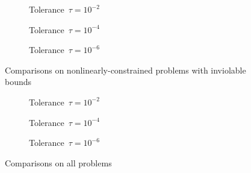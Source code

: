 \begin{figure}[ht]
    \centering
    \begin{subfigure}[b]{0.49\textwidth}
        \centering
        \caption{Tolerance~$\tau = 10^{-2}$}
    \end{subfigure}
    \hfill
    \begin{subfigure}[b]{0.49\textwidth}
        \centering
        \caption{Tolerance~$\tau = 10^{-4}$}
    \end{subfigure}
    \begin{subfigure}[b]{0.49\textwidth}
        \centering
        \caption{Tolerance~$\tau = 10^{-6}$}
    \end{subfigure}
    \caption{Comparisons on nonlinearly-constrained problems with inviolable bounds}
\end{figure}

\begin{figure}[ht]
    \centering
    \begin{subfigure}[b]{0.49\textwidth}
        \centering
        \caption{Tolerance~$\tau = 10^{-2}$}
    \end{subfigure}
    \hfill
    \begin{subfigure}[b]{0.49\textwidth}
        \centering
        \caption{Tolerance~$\tau = 10^{-4}$}
    \end{subfigure}
    \begin{subfigure}[b]{0.49\textwidth}
        \centering
        \caption{Tolerance~$\tau = 10^{-6}$}
    \end{subfigure}
    \caption{Comparisons on all problems}
\end{figure}


